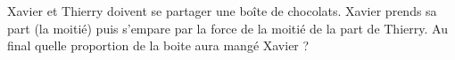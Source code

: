 
\begin{exercice}\label{exosmath-0264}

Xavier et Thierry doivent se partager une boîte de chocolats. Xavier prends sa part (la moitié) puis s'empare par la force de la moitié de la part de Thierry. Au final quelle proportion de la boite aura mangé Xavier ?

\end{exercice}
